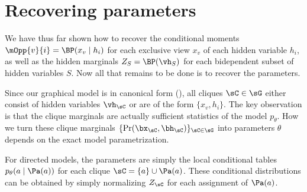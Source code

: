 \section{Recovering parameters}
\label{sec:undirected}

We have thus far shown how to recover the conditional moments
$\mOpp{v}{i} = \BP(x_v \mid h_i)$ for each exclusive view $x_v$ of each hidden variable $h_i$,
as well as the hidden marginals $Z_S = \BP(\vh_S)$ for each bidependent subset of hidden variables $S$.
Now all that remains to be done is to recover the parameters.

Since our graphical model is in canonical form (),
all cliques $\sC \in \sG$
either consist of hidden variables $\vh_\sC$ or are of the form $\{x_v,h_i\}$.
The key observation is that the clique marginals are actually sufficient
statistics of the model $p_\theta$.
How we turn these clique marginals $\{ \Pr(\bx_\sC,\bh_\sC) \}_{\sC \in \sG}$
into parameters $\theta$ depends on the exact model parametrization.

For directed models, the parameters are simply the local conditional tables
$p_\theta(a \mid \Pa(a))$ for each clique $\sC = \{a\} \cup \Pa(a)$.
These conditional distributions can be obtained by simply normalizing $Z_\sC$
for each assignment of $\Pa(a)$.



